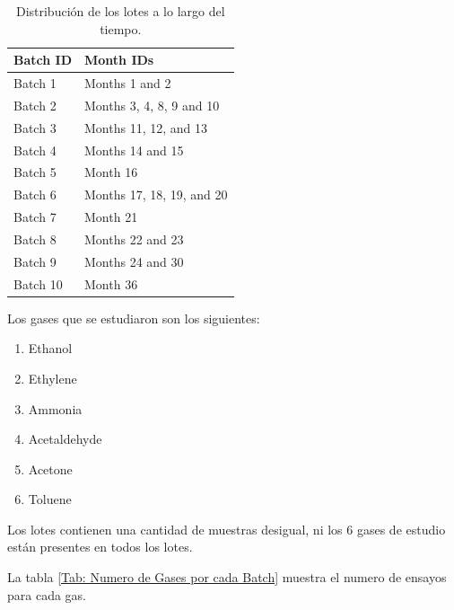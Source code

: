 \begin{table}[h!]
\begin{tabular}{|l|l|}
\hline
Batch ID & Month IDs                   \\ \hline
Batch 1  & Months 1 and 2              \\
Batch 2  & Months 3, 4, 8, 9 and 10    \\
Batch 3  & Months 11, 12, and 13       \\
Batch 4  & Months 14 and 15            \\
Batch 5  & Month 16                    \\
Batch 6  & Months 17, 18, 19, and 20   \\
Batch 7  & Month 21                    \\
Batch 8  & Months 22 and 23            \\
Batch 9  & Months 24 and 30            \\
Batch 10 & Month 36                    \\
\end{tabular}
    \caption{ Distribución de los lotes a lo largo del tiempo.}
\end{table}

Los gases que se estudiaron son los siguientes:
\begin{enumerate}
    \item Ethanol
    \item Ethylene
    \item Ammonia
    \item Acetaldehyde
    \item Acetone
    \item Toluene
\end{enumerate}

Los lotes contienen una cantidad de muestras desigual, ni los 6 gases de estudio están presentes en todos los lotes.

La tabla \ref{Tab: Numero de Gases por cada Batch} muestra el numero de ensayos para cada gas.

